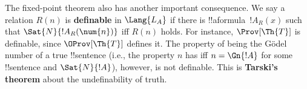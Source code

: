 The fixed-point theorem also has another important consequence. We say
a relation $R(n)$ is \textbf{definable} in $\Lang{L_A}$ if there is
!!a{formula}~$!A_R(x)$ such that $\Sat{N}{!A_R(\num{n})}$ iff $R(n)$
holds. For instance, $\Prov[\Th{T}]$ is definable, since
$\OProv[\Th{T}]$ defines it. The property of being the G\"odel number
of a true !!{sentence} (i.e., the property $n$ has iff $n = \Gn{!A}$ for
some !!{sentence} and $\Sat{N}{!A}$), however, is not
definable. This is \textbf{Tarski's theorem} about the undefinability
of truth.
